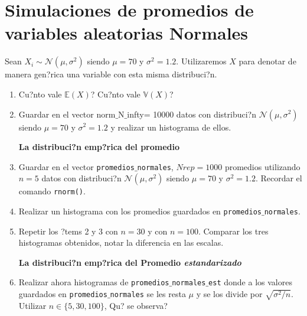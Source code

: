 \documentclass[12pt]{article}
\begin{document}
\section{Simulaciones de promedios de variables aleatorias Normales}

Sean $X_i\sim \mathcal N(\mu, \sigma^2)$ siendo $\mu=70$ y $\sigma^2=1.2$. Utilizaremos $X$ para denotar de manera gen?rica una variable con esta misma distribuci?n.  



\begin{enumerate}	
	\item \textquestiondown Cu?nto vale $\mathbb E(X)$?
	\textquestiondown Cu?nto vale $\mathbb{V}(X)$?
	
	\item Guardar en el vector norm$\_$N$\_$infty= 10000 datos con distribuci?n $\mathcal N(\mu, \sigma^2)$ siendo $\mu=70$ y $\sigma^2=1.2$ y realizar un histograma de ellos. 
	
	
	\vspace{0.2cm}	
	\textbf{La distribuci?n emp?rica del promedio}
	
	\item Guardar en el  vector \texttt{promedios$\_$normales}, $Nrep=1000$ promedios utilizando $n=5$ datos con distribuci?n $\mathcal N(\mu, \sigma^2)$ siendo $\mu=70$ y $\sigma^2=1.2$. Recordar el comando \texttt{rnorm()}.
	\item Realizar un histograma con los promedios guardados en \texttt{promedios$\_$normales}.
	\item Repetir los ?tems 2 y 3 con $n=30$ y con $n=100$. Comparar los tres histogramas obtenidos, notar la diferencia en las escalas.
	
	\vspace{0.2cm}
	\textbf{La distribuci?n emp?rica  del Promedio \textit{estandarizado}}
	
	
	\item  Realizar ahora histogramas de \texttt{promedios$\_$normales$\_$est} donde a los valores guardados en \texttt{promedios$\_$normales} se les resta $\mu$ y se los divide por $\sqrt{\sigma^2/n}$. Utilizar  $n \in \{5,30,100\}$, \textquestiondown Qu? se observa?
	
	
	
\end{enumerate}
\end{document}
